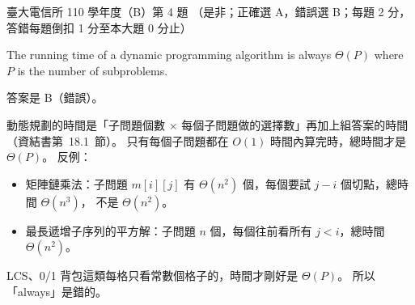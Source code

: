 \begin{pastexam}[label={px:ntu-110-comm-dsa-04}]{臺大電信所 110 學年度（B）第 4 題}
（是非；正確選 A，錯誤選 B；每題 2 分，答錯每題倒扣 1 分至本大題 0 分止）

The running time of a dynamic programming algorithm is always $\Theta(P)$ where $P$ is the number of subproblems.
\end{pastexam}

\begin{pastsoln}
答案是 B（錯誤）。

動態規劃的時間是「子問題個數 $\times$ 每個子問題做的選擇數」再加上組答案的時間（資結書第~18.1~節）。
只有每個子問題都在 $O(1)$ 時間內算完時，總時間才是 $\Theta(P)$。 反例：
\begin{itemize}
\item 矩陣鏈乘法：子問題 $m[i][j]$ 有 $\Theta(n^2)$ 個，每個要試 $j - i$ 個切點，總時間 $\Theta(n^3)$，
不是 $\Theta(n^2)$。
\item 最長遞增子序列的平方解：子問題 $n$ 個，每個往前看所有 $j < i$，總時間 $\Theta(n^2)$。
\end{itemize}
LCS、0/1 背包這類每格只看常數個格子的，時間才剛好是 $\Theta(P)$。 所以「always」是錯的。
\end{pastsoln}
